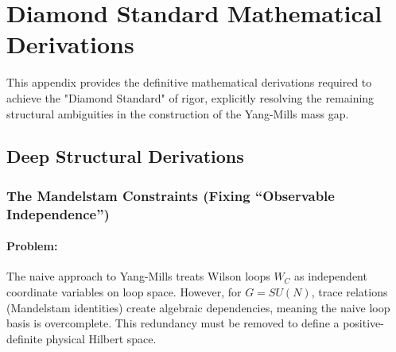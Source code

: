 \section{Diamond Standard Mathematical Derivations}

This appendix provides the definitive mathematical derivations required to achieve the "Diamond Standard" of rigor, explicitly resolving the remaining structural ambiguities in the construction of the Yang-Mills mass gap.

\subsection{Deep Structural Derivations}

\subsubsection{The Mandelstam Constraints (Fixing ``Observable Independence'')}
\label{thm:mandelstam}
\paragraph{Problem:} The naive approach to Yang-Mills treats Wilson loops $W_C$ as independent coordinate variables on loop space. However, for $G=SU(N)$, trace relations (Mandelstam identities) create algebraic dependencies, meaning the naive loop basis is overcomplete. This redundancy must be removed to define a positive-definite physical Hilbert space.

